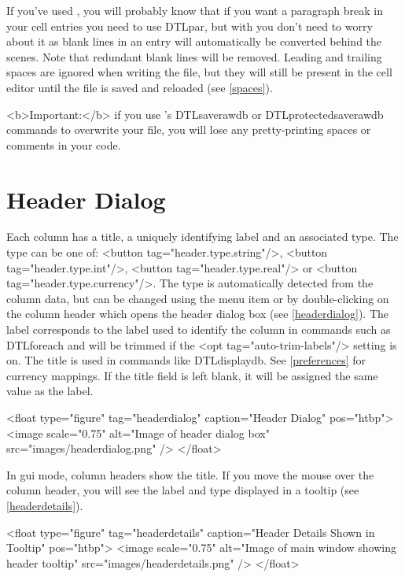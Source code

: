    If you've used , you will probably know that 
   if you want a paragraph break in your cell entries you need to use 
   \gls{DTLpar}, but with  you don't need to worry about it 
   as blank lines in an entry will automatically be converted behind 
   the scenes. Note that redundant blank lines will be removed. Leading
   and trailing spaces are ignored when writing the  file,
   but they will still be present in the cell editor until the file is
   saved and reloaded (see \autoref{spaces}).


   <b>Important:</b> if you use 's \gls{DTLsaverawdb} 
   or \gls{DTLprotectedsaverawdb} commands to overwrite your file, you 
   will lose any pretty-printing spaces or comments in your code.


\section{Header Dialog}\label{editheader}

     Each column has a title, a uniquely identifying label
     and an associated type. The type can be one of:
     <button tag="header.type.string"/>, 
     <button tag="header.type.int"/>, 
     <button tag="header.type.real"/> or 
     <button tag="header.type.currency"/>.
     The type is automatically detected from the column data,
     but can be changed using the 
     menu item or by double-clicking on the column header which opens the 
     header dialog box (see \autoref{headerdialog}). The label corresponds 
     to the label used to identify the column in commands such
     as \gls{DTLforeach} and will be trimmed if the 
     <opt tag="auto-trim-labels"/> setting is on. The title is used in 
     commands like \gls{DTLdisplaydb}. See \autoref{preferences} for 
     currency mappings. If the title field is left blank, it will be assigned 
     the same value as the label.

     <float type="figure" tag="headerdialog" caption="Header Dialog" pos="htbp">
      <image scale="0.75" alt="Image of header dialog box" src="images/headerdialog.png" />
     </float>

     In \gls{gui} mode, column headers show the
     title. If you move the mouse over the column header, you will see the
     label and type displayed in a tooltip (see 
     \autoref{headerdetails}).

     <float type="figure" tag="headerdetails" caption="Header Details Shown in Tooltip" pos="htbp">
      <image scale="0.75" alt="Image of main window showing header tooltip"
         src="images/headerdetails.png" />
     </float>

